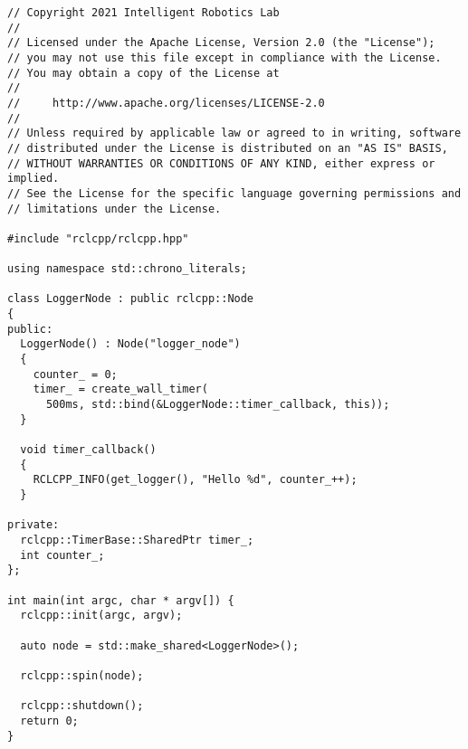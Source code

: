  \footnotesize
\begin{tcolorbox}[sharp corners, colframe=gray!80, colback=LightGray, left=0pt, top=0pt, bottom=0pt, title=\texttt{br2\_basics/src/logger\_class.cpp}]
  \begin{verbatim}
// Copyright 2021 Intelligent Robotics Lab
//
// Licensed under the Apache License, Version 2.0 (the "License");
// you may not use this file except in compliance with the License.
// You may obtain a copy of the License at
//
//     http://www.apache.org/licenses/LICENSE-2.0
//
// Unless required by applicable law or agreed to in writing, software
// distributed under the License is distributed on an "AS IS" BASIS,
// WITHOUT WARRANTIES OR CONDITIONS OF ANY KIND, either express or implied.
// See the License for the specific language governing permissions and
// limitations under the License.

#include "rclcpp/rclcpp.hpp"  

using namespace std::chrono_literals;

class LoggerNode : public rclcpp::Node
{
public:
  LoggerNode() : Node("logger_node")
  {
    counter_ = 0;
    timer_ = create_wall_timer(
      500ms, std::bind(&LoggerNode::timer_callback, this));
  }

  void timer_callback()
  {
    RCLCPP_INFO(get_logger(), "Hello %d", counter_++);
  }

private:
  rclcpp::TimerBase::SharedPtr timer_;
  int counter_;
};

int main(int argc, char * argv[]) { 
  rclcpp::init(argc, argv);  

  auto node = std::make_shared<LoggerNode>();

  rclcpp::spin(node); 

  rclcpp::shutdown();  
  return 0;  
}    \end{verbatim}
    \end{tcolorbox}
  \normalsize

